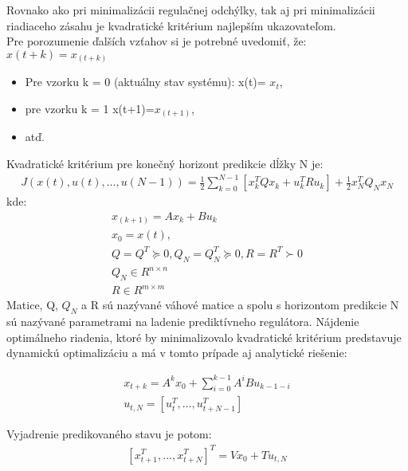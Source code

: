 Rovnako ako pri minimalizácii regulačnej odchýlky, tak aj pri minimalizácii riadiaceho zásahu je kvadratické kritérium najlepším ukazovateľom. \\
Pre porozumenie ďalších vzťahov si je potrebné uvedomiť, že: $x(t+k) =x_{(t+k)}$ \\
\begin{itemize}
\item Pre vzorku k = 0 (aktuálny stav systému): x(t)= $x_t$, 
\item pre vzorku k = 1 x(t+1)=$x_{(t+1)}$, 
\item atď.
\end{itemize}
Kvadratické kritérium pre konečný horizont predikcie dĺžky N je:
\begin{equation} \label{eq3}
\begin{split}
J(x(t),u(t),…,u(N-1))=\frac{1}{2}∑_{k=0}^{N-1}[x_k^T Qx_k+u_k^T Ru_k ] +  \frac{1}{2} x_N^T Q_N x_N
\end{split}
\end{equation}
kde:
\begin{equation} \label{eq4}
\begin{split}
x_(k+1)=Ax_k+Bu_k \\
x_0=x(t), \\
Q=Q^T  \succcurlyeq 0,Q_N=Q_N^T \succcurlyeq 0,R=R^T \succ 0 \\
Q_N∈R^{n×n} \\
R∈R^{m×m}
\end{split}
\end{equation}
Matice, Q, $Q_N$ a R sú nazývané váhové matice a spolu s horizontom predikcie N sú nazývané parametrami na ladenie prediktívneho regulátora. Nájdenie optimálneho riadenia, ktoré by minimalizovalo kvadratické kritérium predstavuje dynamickú optimalizáciu a má v tomto prípade aj analytické riešenie: \cite{MPC05}

\begin{equation} \label{eq5}
\begin{split}
x_{t+k}= A^k x_0+ ∑_{i=0}^{k-1}A^i Bu_{k-1-i}\\
u_{t,N}=[u_t^T,…,u_{t+N-1}^T  ]
\end{split}
\end{equation}

Vyjadrenie predikovaného stavu je potom:
\begin{equation} \label{eq6}
\begin{split}
[ x_{t+1}^T,…,x_{t+N}^T  ]^T=Vx_0+Tu_{t,N}
\end{split}
\end{equation}

